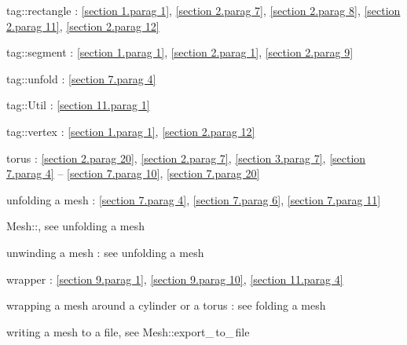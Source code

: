 \documentclass[a4paper]{scrreprt}
\def\numb{}
\newcommand\verm[1]{\textcolor{manif}{#1}}
\renewcommand\tt{\normalfont\ttfamily}
\begin{document}
\noindent
{\small\tt\textcolor{tag}{tag}::rectangle} : \ref{\numb section 1.\numb parag 1},
\ref{\numb section 2.\numb parag 7}, \ref{\numb section 2.\numb parag 8},
\ref{\numb section 2.\numb parag 11}, \ref{\numb section 2.\numb parag 12}

\noindent
{\small\tt\textcolor{tag}{tag}::segment} : \ref{\numb section 1.\numb parag 1}, 
\ref{\numb section 2.\numb parag 1}, \ref{\numb section 2.\numb parag 9}

\noindent
{\small\tt\textcolor{tag}{tag}::unfold} : \ref{\numb section 7.\numb parag 4}

\noindent
{\small\tt\textcolor{tag}{tag}::Util} : \ref{\numb section 11.\numb parag 1}
  
\noindent
{\small\tt\textcolor{tag}{tag}::vertex} : \ref{\numb section 1.\numb parag 1},
\ref{\numb section 2.\numb parag 12}
  
\noindent
torus : \ref{\numb section 2.\numb parag 20}, \ref{\numb section 2.\numb parag 7},
\ref{\numb section 3.\numb parag 7},
\ref{\numb section 7.\numb parag 4} -- \ref{\numb section 7.\numb parag 10},
\ref{\numb section 7.\numb parag 20}

\noindent
unfolding a mesh : \ref{\numb section 7.\numb parag 4}, \ref{\numb section 7.\numb parag 6},
\ref{\numb section 7.\numb parag 11}

\noindent
{\small\tt\verm{Mesh}::}, see unfolding a mesh

\noindent
unwinding a mesh : see unfolding a mesh

\noindent
wrapper : \ref{\numb section 9.\numb parag 1}, \ref{\numb section 9.\numb parag 10},
\ref{\numb section 11.\numb parag 4}

\noindent
wrapping a mesh around a cylinder or a torus : see folding a mesh

\noindent
writing a mesh to a file, see {\small\tt\verm{Mesh}::export\_\,to\_\,file}
\end{document}
